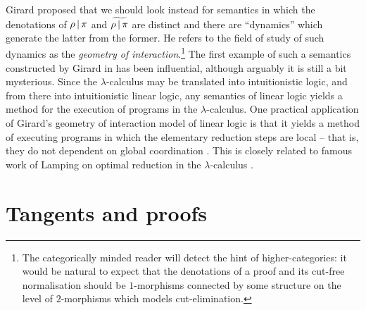 \documentclass[english,letter paper,12pt,reqno]{article}
\DeclarePairedDelimiter\ket{\lvert}{\rangle}
\theoremstyle{example}
\newtheorem{definition}[theorem]{Definition}
\numberwithin{equation}{section}
\begin{document}
Girard proposed \cite{girard_towards} that we should look instead for semantics in which the denotations of $\rho \,|\, \pi$ and $\widetilde{\rho\,|\,\pi}$ are distinct and there are ``dynamics'' which generate the latter from the former. He refers to the field of study of such dynamics as the \emph{geometry of interaction}.\footnote{The categorically minded reader will detect the hint of higher-categories: it would be natural to expect that the denotations of a proof and its cut-free normalisation should be $1$-morphisms connected by some structure on the level of $2$-morphisms which models cut-elimination.} The first example of such a semantics constructed by Girard in \cite{girard_goi1} has been influential, although arguably it is still a bit mysterious. Since the $\lambda$-calculus may be translated into intuitionistic logic, and from there into intuitionistic linear logic, any semantics of linear logic yields a method for the execution of programs in the $\lambda$-calculus. One practical application of Girard's geometry of interaction model of linear logic is that it yields a method of executing programs in which the elementary reduction steps are local -- that is, they do not dependent on global coordination \cite{danos_regnier1,danos_regnier2}. This is closely related to famous work of Lamping on optimal reduction in the $\lambda$-calculus \cite{Gonthier}.

\appendix

\section{Tangents and proofs}\label{section:example_lifting}




\end{document}
